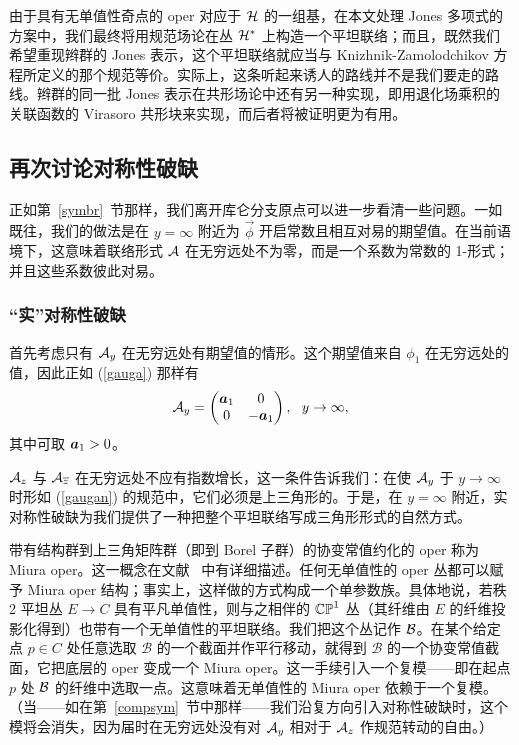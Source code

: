 由于具有无单值性奇点的 oper 对应于 $\H$ 的一组基，在本文处理 Jones 多项式的方案中，我们最终将用规范场论在丛 $\H^*$ 上构造一个平坦联络；而且，既然我们希望重现辫群的 Jones 表示，这个平坦联络就应当与 Knizhnik-Zamolodchikov 方程所定义的那个规范等价。实际上，这条听起来诱人的路线并不是我们要走的路线。辫群的同一批 Jones 表示在共形场论中还有另一种实现，即用退化场乘积的关联函数的 Virasoro 共形块来实现，而后者将被证明更为有用。




\subsection{再次讨论对称性破缺}\label{moresymbr}

正如第~\ref{symbr}~节那样，我们离开库仑分支原点可以进一步看清一些问题。一如既往，我们的做法是在 $y=\infty$ 附近为 $\vec \phi$ 开启常数且相互对易的期望值。在当前语境下，这意味着联络形式 $\A$ 在无穷远处不为零，而是一个系数为常数的 1-形式；并且这些系数彼此对易。

\subsubsection{“实”对称性破缺}\label{realsym}

首先考虑只有 $\A_y$ 在无穷远处有期望值的情形。这个期望值来自 $\phi_1$ 在无穷远处的值，因此正如 (\ref{gauga}) 那样有
\begin{equation}\label{gaugan}
\A_y = \begin{pmatrix} \ca_1 & 0 \cr 0 & -\ca_1\end{pmatrix},~~y\to\infty,
\end{equation}
其中可取 $\ca_1>0$。

$\A_z$ 与 $\A_{\bar z}$ 在无穷远处不应有指数增长，这一条件告诉我们：在使 $\A_y$ 于 $y\to\infty$ 时形如 (\ref{gaugan}) 的规范中，它们必须是上三角形的。于是，在 $y=\infty$ 附近，实对称性破缺为我们提供了一种把整个平坦联络写成三角形形式的自然方式。

带有结构群到上三角矩阵群（即到 Borel 子群）的协变常值约化的 oper 称为 Miura oper。这一概念在文献~\cite{Frenkel} 中有详细描述。任何无单值性的 oper 丛都可以赋予 Miura oper 结构；事实上，这样做的方式构成一个单参数族。具体地说，若秩 2 平坦丛 $E\to C$ 具有平凡单值性，则与之相伴的 $\Bbb{CP}^1$ 丛（其纤维由 $E$ 的纤维投影化得到）也带有一个无单值性的平坦联络。我们把这个丛记作 $\B$。在某个给定点 $p\in C$ 处任意选取 $\mathcal B$ 的一个截面并作平行移动，就得到 $\mathcal B$ 的一个协变常值截面，它把底层的 oper 变成一个 Miura oper。这一手续引入一个复模——即在起点 $p$ 处 $\B$ 的纤维中选取一点。这意味着无单值性的 Miura oper 依赖于一个复模。（当——如在第~\ref{compsym}~节中那样——我们沿复方向引入对称性破缺时，这个模将会消失，因为届时在无穷远处没有对 $\A_y$ 相对于 $\A_z$ 作规范转动的自由。）

